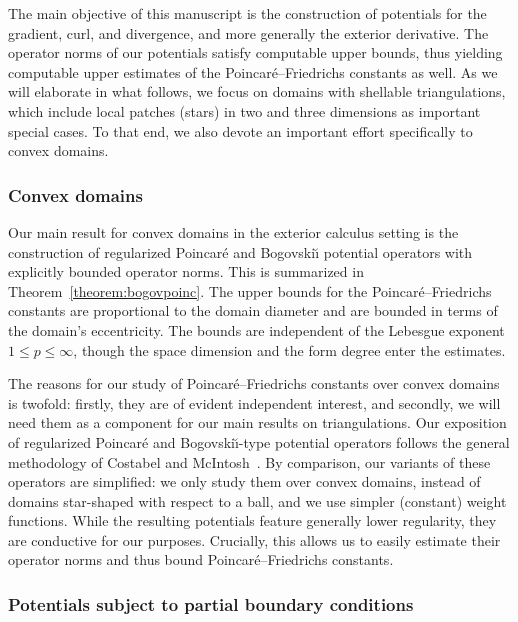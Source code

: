 \documentclass[10pt,a4paper]{article}
\begin{document}
The main objective of this manuscript is the construction of potentials for the gradient, curl, and divergence, and more generally the exterior derivative. 
The operator norms of our potentials satisfy computable upper bounds, thus yielding computable upper estimates of the Poincar\'e--Friedrichs constants as well. 
As we will elaborate in what follows, we focus on domains with shellable triangulations, which include local patches (stars) in two and three dimensions as important special cases. 
To that end, we also devote an important effort specifically to convex domains. 


\subsubsection{Convex domains}

Our main result for convex domains in the exterior calculus setting is the construction of regularized Poincar\'e and Bogovski\u{\i} potential operators with explicitly bounded operator norms. 
This is summarized in Theorem~\ref{theorem:bogovpoinc}. 
The upper bounds for the Poincar\'e--Friedrichs constants are proportional to the domain diameter and are bounded in terms of the domain's eccentricity. 
The bounds are independent of the Lebesgue exponent $1 \leq p \leq \infty$, though the space dimension and the form degree enter the estimates. 

The reasons for our study of Poincar\'e--Friedrichs constants over convex domains is twofold: 
firstly, they are of evident independent interest, and secondly, we will need them as a component for our main results on triangulations. 
Our exposition of regularized Poincar\'e and Bogovski\u{\i}-type potential operators follows the general methodology of Costabel and McIntosh~\cite{costabel2010bogovskiui}.
By comparison, our variants of these operators are simplified: 
we only study them over convex domains, instead of domains star-shaped with respect to a ball, 
and we use simpler (constant) weight functions. 
While the resulting potentials feature generally lower regularity, they are conductive for our purposes. 
Crucially, this allows us to easily estimate their operator norms and thus bound Poincar\'e--Friedrichs constants. 


\subsubsection{Potentials subject to partial boundary conditions}
\end{document}
